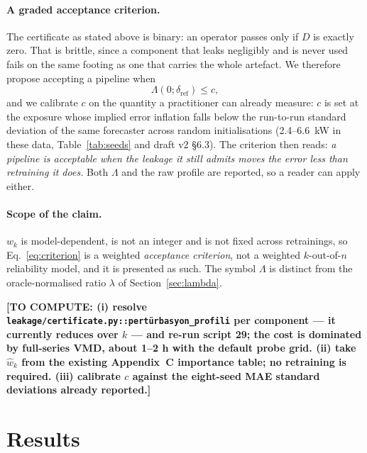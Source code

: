 \documentclass[review,3p,times]{elsarticle}
\newcommand{\todo}[1]{\textbf{[TO COMPUTE: #1]}}
\begin{document}
\paragraph{A graded acceptance criterion.} The certificate as stated above is
binary: an operator passes only if $D$ is exactly zero. That is brittle, since a
component that leaks negligibly and is never used fails on the same footing as
one that carries the whole artefact. We therefore propose accepting a pipeline
when
\begin{equation}
\Lambda(0;\delta_{\mathrm{ref}})\le c ,
\label{eq:criterion}
\end{equation}
and we calibrate $c$ on the quantity a practitioner can already measure: $c$ is
set at the exposure whose implied error inflation falls below the run-to-run
standard deviation of the same forecaster across random initialisations
(2.4--6.6~kW in these data, Table~\ref{tab:seeds} and draft v2 §6.3). The
criterion then reads: \emph{a pipeline is acceptable when the leakage it still
admits moves the error less than retraining it does.} Both $\Lambda$ and the
raw profile are reported, so a reader can apply either.

\paragraph{Scope of the claim.} $w_k$ is model-dependent, is not an integer and
is not fixed across retrainings, so Eq.~\eqref{eq:criterion} is a weighted
\emph{acceptance criterion}, not a weighted $k$-out-of-$n$ reliability model, and
it is presented as such. The symbol $\Lambda$ is distinct from the
oracle-normalised ratio $\lambda$ of Section~\ref{sec:lambda}.

\todo{(i) resolve \texttt{leakage/certificate.py::pertürbasyon\_profili} per
component --- it currently reduces over $k$ --- and re-run script 29; the cost is
dominated by full-series VMD, about 1--2 h with the default probe grid.
(ii) take $\hat w_k$ from the existing Appendix~C importance table; no retraining
is required. (iii) calibrate $c$ against the eight-seed MAE standard deviations
already reported.}

\section{Results}\label{sec:results}
\end{document}
